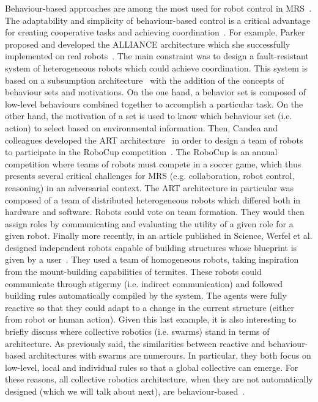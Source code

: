   Behaviour-based approaches are among the most used for robot control in MRS~\parencite{Arkin1998, Mataric2008, Parker2008}. The adaptability and simplicity of behaviour-based control is a critical advantage for creating cooperative tasks and achieving coordination~\parencite{Mataric1995, Iocchi2001}. For example, Parker proposed and developed the ALLIANCE architecture which she successfully implemented on real robots~\parencite{Parker1994}. The main constraint was to design a fault-resistant system of heterogeneous robots which could achieve coordination. This system is based on a subsumption architecture~\parencite{Brooks1986} with the addition of the concepts of behaviour sets and motivations. On the one hand, a behavior set is composed of low-level behaviours combined together to accomplish a particular task. On the other hand, the motivation of a set is used to know which behaviour set (i.e. action) to select based on environmental information. Then, Candea and colleagues developed the ART architecture~\parencite{Candea2001} in order to design a team of robots to participate in the RoboCup competition~\parencite{Kitano1997}. The RoboCup is an annual competition where teams of robots must compete in a soccer game, which thus presents several critical challenges for MRS (e.g. collaboration, robot control, reasoning) in an adversarial context. The ART architecture in particular was composed of a team of distributed heterogeneous robots which differed both in hardware and software. Robots could vote on team formation. They would then assign roles by communicating and evaluating the utility of a given role for a given robot. Finally more recently, in an article published in Science, Werfel et al. designed independent robots capable of building structures whose blueprint is given by a user~\parencite{Werfel2014}. They used a team of homogeneous robots, taking inspiration from the mount-building capabilities of termites. These robots could communicate through stigermy (i.e. indirect communication) and followed building rules automatically compiled by the system. The agents were fully reactive so that they could adapt to a change in the current structure (either from robot or human action). Given this last example, it is also interesting to briefly discuss where collective robotics (i.e. swarms) stand in terms of architecture. As previously said, the similarities between reactive and behaviour-based architectures with swarms are numerours. In particular, they both focus on low-level, local and individual rules so that a global collective can emerge. For these reasons, all collective robotics architecture, when they are not automatically designed (which we will talk about next), are behaviour-based~\parencite{Brambilla2012, Zoghby2013}.


